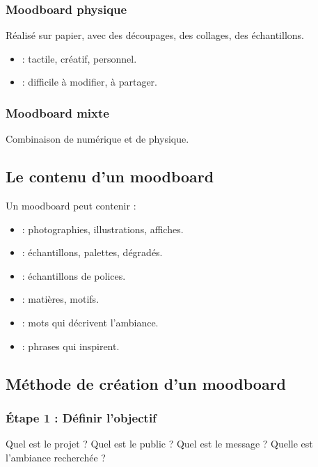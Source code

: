 \subsubsection{Moodboard physique}

Réalisé sur papier, avec des découpages, des collages, des échantillons.

\begin{itemize}
    \item {} : tactile, créatif, personnel.
    \item {} : difficile à modifier, à partager.
\end{itemize}

\subsubsection{Moodboard mixte}

Combinaison de numérique et de physique.

\subsection{Le contenu d'un moodboard}

Un moodboard peut contenir :

\begin{itemize}
    \item {} : photographies, illustrations, affiches.
    \item {} : échantillons, palettes, dégradés.
    \item {} : échantillons de polices.
    \item {} : matières, motifs.
    \item {} : mots qui décrivent l'ambiance.
    \item {} : phrases qui inspirent.
\end{itemize}

\subsection{Méthode de création d'un moodboard}

\subsubsection{Étape 1 : Définir l'objectif}

Quel est le projet ? Quel est le public ? Quel est le message ? Quelle est l'ambiance recherchée ?

